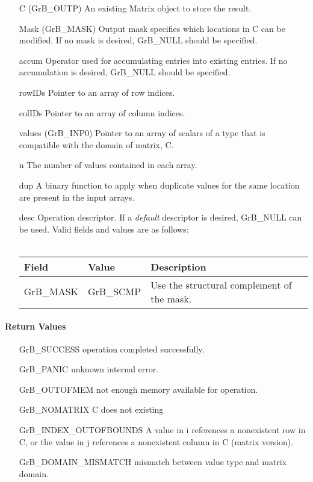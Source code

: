 \begin{itemize}[leftmargin=1.1in]
    \item[{\sf C}]      ({\sf GrB\_OUTP}) An existing Matrix object to store the result.
    \item[{\sf Mask}]   ({\sf GrB\_MASK}) Output mask specifies which locations in
                        {\sf C} can be modified.  If no mask is desired,
                        {\sf GrB\_NULL} should be specified.
    \item[{\sf accum}]  Operator used for accumulating entries into existing
                         entries. If no accumulation is desired,
                        {\sf GrB\_NULL} should be specified.
    \item[{\sf rowIDs}] Pointer to an array of row indices. 
    \item[{\sf colIDs}] Pointer to an array of column indices. 
    \item[{\sf values}] ({\sf GrB\_INP0}) Pointer to an array of scalars of a type that
                                     is compatible with the domain of matrix, {\sf C}.
    \item[{\sf n}]      The number of values contained in each array.
    \item[{\sf dup}]    A binary function to apply when duplicate values for
                        the same location are present in the input arrays.
    \item[{\sf desc}]   Operation descriptor. If a
    \emph{default} descriptor is desired, {\sf GrB\_NULL} can be
    used.  Valid fields and values are as follows: \\ ~\\
    \begin{tabular}{llp{3in}}
    Field  & Value & Description \\
    \hline
    {\sf GrB\_MASK} & {\sf GrB\_SCMP}   & Use the structural complement of the mask. \\
    \end{tabular}
\end{itemize}

\paragraph{Return Values}

\begin{itemize}[leftmargin=2.1in]
\item[{\sf GrB\_SUCCESS}]      operation completed successfully.
\item[{\sf GrB\_PANIC}]        unknown internal error.
\item[{\sf GrB\_OUTOFMEM}]     not enough memory available for operation.
\item[{\sf GrB\_NOMATRIX}]     C does not existing
\item[{\sf GrB\_INDEX\_OUTOFBOUNDS}]
        A value in i references a nonexistent row in C, or
        the value in j references a nonexistent column in C (matrix version).
\item[\sf GrB\_DOMAIN\_MISMATCH]  
       mismatch between value type and matrix domain.
\end{itemize}


